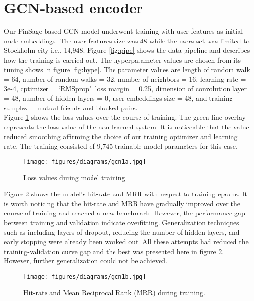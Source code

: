 \documentclass{kththesis}
\begin{document}
\section{GCN-based encoder} \label{gcn}
Our PinSage based GCN model underwent training with user features as initial node embeddings. The user features size was 48 while the users set was limited to Stockholm city i.e., 14,948. Figure \ref{fig:pipe} shows the data pipeline and describes how the training is carried out. The hyperparameter values are chosen from its tuning shows in figure \ref{fig:hype}. The parameter values are length of random walk = 64, number of random walks = 32, number of neighbors = 16, learning rate = 3e-4, optimizer = ‘RMSprop’, loss margin = 0.25, dimension of convolution layer = 48, number of hidden layers = 0, user embeddings size = 48, and training samples = mutual friends and blocked pairs. \\

Figure \ref{fig:gcn1a} shows the loss values over the course of training. The green line overlay represents the loss value of the non-learned system. It is noticeable that the value reduced smoothing affirming the choice of our training optimizer and learning rate. The training consisted of 9,745 trainable model parameters for this case. \\

\begin{figure}[h!]
\centering
\texttt{[image: figures/diagrams/gcn1a.jpg]}
\caption{Loss values during model training}
\label{fig:gcn1a}
\end{figure}

\newpage

Figure \ref{fig:gcn1b} shows the model's hit-rate and MRR with respect to training epochs. It is worth noticing that the hit-rate and MRR have gradually improved over the course of training and reached a new benchmark. However, the performance gap between training and validation indicate overfitting. Generalization techniques such as including layers of dropout, reducing the number of hidden layers, and early stopping were already been worked out. All these attempts had reduced the training-validation curve gap and the best was presented here in figure \ref{fig:gcn1b}. However, further generalization could not be achieved. \\

\begin{figure}[h!]
\centering
\texttt{[image: figures/diagrams/gcn1b.jpg]}
\caption{Hit-rate and Mean Reciprocal Rank (MRR) during training. }
\label{fig:gcn1b}
\end{figure}
\end{document}
